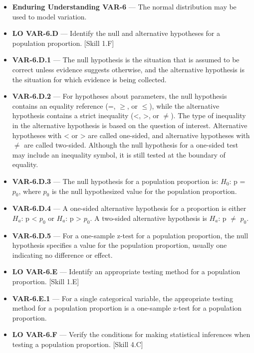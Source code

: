 \documentclass[11pt]{article}
\begin{document}


{\small
\begin{itemize}[leftmargin=1.5em,itemsep=2pt,topsep=2pt]
  \item \textbf{Enduring Understanding VAR-6} --- The normal distribution may be used to model variation.
  \item \textbf{LO VAR-6.D} --- Identify the null and alternative hypotheses for a population proportion. [Skill 1.F]
  \item \textbf{VAR-6.D.1} --- The null hypothesis is the situation that is assumed to be correct unless evidence suggests otherwise, and the alternative hypothesis is the situation for which evidence is being collected.
  \item \textbf{VAR-6.D.2} --- For hypotheses about parameters, the null hypothesis contains an equality reference (=, $\geq$, or $\leq$), while the alternative hypothesis contains a strict inequality (<, >, or $\neq$). The type of inequality in the alternative hypothesis is based on the question of interest. Alternative hypotheses with < or > are called one-sided, and alternative hypotheses with $\neq$ are called two-sided. Although the null hypothesis for a one-sided test may include an inequality symbol, it is still tested at the boundary of equality.
  \item \textbf{VAR-6.D.3} --- The null hypothesis for a population proportion is: $H_0$: p = $p_0$, where $p_0$ is the null hypothesized value for the population proportion.
  \item \textbf{VAR-6.D.4} --- A one-sided alternative hypothesis for a proportion is either $H_a$: p < $p_0$ or $H_a$: p > $p_0$. A two-sided alternative hypothesis is $H_a$: p $\neq$ $p_0$.
  \item \textbf{VAR-6.D.5} --- For a one-sample z-test for a population proportion, the null hypothesis specifies a value for the population proportion, usually one indicating no difference or effect.
  \item \textbf{LO VAR-6.E} --- Identify an appropriate testing method for a population proportion. [Skill 1.E]
  \item \textbf{VAR-6.E.1} --- For a single categorical variable, the appropriate testing method for a population proportion is a one-sample z-test for a population proportion.
  \item \textbf{LO VAR-6.F} --- Verify the conditions for making statistical inferences when testing a population proportion. [Skill 4.C]

\end{itemize}}
\end{document}
